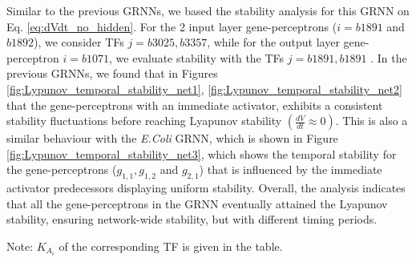 \documentclass[twocolumn]{biophys-new}
\begin{document}
{{%
Similar to the previous GRNNs, we based the  stability analysis for this GRNN on Eq. \ref{eq:dVdt_no_hidden}. For the 2 input layer gene-perceptrons ($i=b1891$ and $b1892$), we consider TFs $j= b3025, b3357$, while for the output layer gene-perceptron $i=b1071$, we evaluate stability with the TFs $j= b1891, b1891$ . 
In the previous GRNNs, we found that in Figures \ref{fig:Lypunov_temporal_stability_net1}, \ref{fig:Lypunov_temporal_stability_net2} that the gene-perceptrons with an immediate activator, exhibits a consistent stability fluctuations before reaching Lyapunov stability $ \left( \frac{dV}{dt} \approx 0 \right)$. This is also a similar behaviour with the \emph{E.Coli} GRNN, which is shown in Figure \ref{fig:Lypunov_temporal_stability_net3}, which shows the temporal stability for the gene-perceptrons ($g_{1,1}, g_{1,2}$ and $g_{2,1}$) that is influenced by the immediate activator predecessors displaying uniform  stability. 
Overall, the analysis indicates that  all the gene-perceptrons in the GRNN eventually attained  the Lyapunov stability, ensuring network-wide stability, but with different timing periods.  

\begin{table}[ht!]
\caption{Parameter values used for the \emph{E.coli} GRNN. \vspace{0.5em}}
\label{simulation_val}
Note:  $K_{A_i}$ of the corresponding TF is given in the table.  
\vspace{-0.8em}
\end{table}

}}
\end{document}
